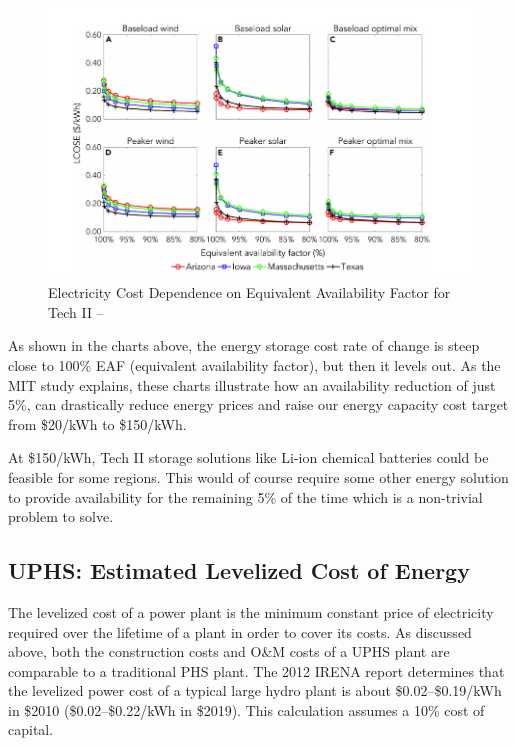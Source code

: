 \documentclass[hidelinks,12pt,a4paper]{article}
\begin{document}
\begin{figure}[ht!]
    \centering
    \includegraphics[width=1\textwidth]{cost-as-function-of-availability-factor.png}
    \caption{Electricity Cost Dependence on Equivalent Availability Factor for Tech II -- \cite{StorageRequirementsAndCostsOfShapingRenewableEnergy}}
\end{figure}
\FloatBarrier

As shown in the charts above, the energy storage cost rate of change is steep close to 100\% EAF (equivalent availability factor), but then it levels out. As the MIT study explains, these charts illustrate how an availability reduction of just 5\%, can drastically reduce energy prices and raise our energy capacity cost target from \$20/kWh to \$150/kWh.

At \$150/kWh, Tech II storage solutions like Li-ion chemical batteries could be feasible for some regions. This would of course require some other energy solution to provide availability for the remaining 5\% of the time which is a non-trivial problem to solve.

\subsection{UPHS: Estimated Levelized Cost of Energy}
The levelized cost of a power plant is the minimum constant price of electricity required over the lifetime of a plant in order to cover its costs. As discussed above, both the construction costs and O\&M costs of a UPHS plant are comparable to a traditional PHS plant. The 2012 IRENA report determines that the levelized power cost of a typical large hydro plant is about \$0.02–\$0.19/kWh in \$2010 (\$0.02–\$0.22/kWh in \$2019). This calculation assumes a 10\% cost of capital.
\end{document}
